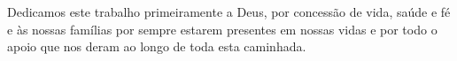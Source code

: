 Dedicamos este trabalho primeiramente a Deus, por concessão de vida, saúde e fé e às nossas famílias por sempre estarem presentes em nossas vidas e por todo o apoio que nos deram ao longo de toda esta caminhada.
